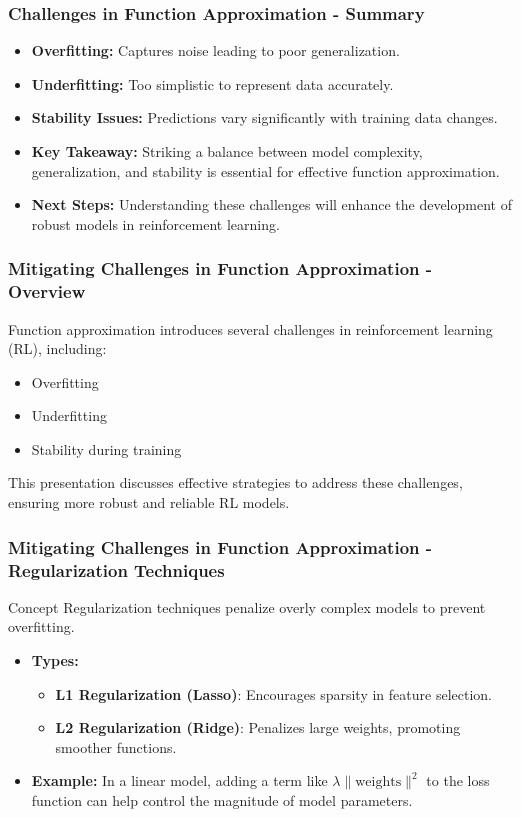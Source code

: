 \documentclass[aspectratio=169]{beamer}
\begin{document}
\begin{frame}[fragile]
    \frametitle{Challenges in Function Approximation - Summary}
    \begin{itemize}
        \item \textbf{Overfitting:} Captures noise leading to poor generalization.
        \item \textbf{Underfitting:} Too simplistic to represent data accurately.
        \item \textbf{Stability Issues:} Predictions vary significantly with training data changes.
        \item \textbf{Key Takeaway:} Striking a balance between model complexity, generalization, and stability is essential for effective function approximation.
        \item \textbf{Next Steps:} Understanding these challenges will enhance the development of robust models in reinforcement learning.
    \end{itemize}
\end{frame}

\begin{frame}[fragile]
    \frametitle{Mitigating Challenges in Function Approximation - Overview}
    Function approximation introduces several challenges in reinforcement learning (RL), including:
    \begin{itemize}
        \item Overfitting
        \item Underfitting
        \item Stability during training
    \end{itemize}
    This presentation discusses effective strategies to address these challenges, ensuring more robust and reliable RL models.
\end{frame}

\begin{frame}[fragile]
    \frametitle{Mitigating Challenges in Function Approximation - Regularization Techniques}
    \begin{block}{Concept}
        Regularization techniques penalize overly complex models to prevent overfitting.
    \end{block}
    \begin{itemize}
        \item \textbf{Types:}
        \begin{itemize}
            \item \textbf{L1 Regularization (Lasso)}: Encourages sparsity in feature selection.
            \item \textbf{L2 Regularization (Ridge)}: Penalizes large weights, promoting smoother functions.
        \end{itemize}
        \item \textbf{Example:} 
        In a linear model, adding a term like $\lambda \| \text{weights} \|^2$ to the loss function can help control the magnitude of model parameters.
    \end{itemize}
\end{frame}
\end{document}
